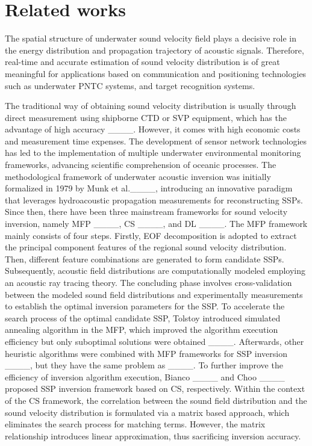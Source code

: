 \section{Related works}
The spatial structure of underwater sound velocity field plays a decisive role in the energy distribution and propagation trajectory of acoustic signals. Therefore, real-time and accurate estimation of sound velocity distribution is of great meaningful for applications based on communication and positioning technologies such as underwater PNTC systems, and target recognition systems.

The traditional way of obtaining sound velocity distribution is usually through direct measurement using shipborne CTD or SVP equipment, which has the advantage of high accuracy ____. However, it comes with high economic costs and measurement time expenses. The development of sensor network technologies has led to the implementation of multiple underwater environmental monitoring frameworks, advancing scientific comprehension of oceanic processes. The methodological framework of underwater acoustic inversion was initially formalized in 1979 by Munk et al.____, introducing an innovative paradigm that leverages hydroacoustic propagation measurements for reconstructing SSPs. Since then, there have been three mainstream frameworks for sound velocity inversion, namely MFP ____, CS ____, and DL ____. The MFP framework mainly consists of four steps. Firstly, EOF decomposition is adopted to extract the principal component features of the regional sound velocity distribution. Then, different feature combinations are generated to form candidate SSPs. Subsequently, acoustic field distributions are computationally modeled employing an acoustic ray tracing theory. The concluding phase involves cross-validation between the modeled sound field distributions and experimentally measurements to establish the optimal inversion parameters for the SSP. To accelerate the search process of the optimal candidate SSP, Tolstoy introduced simulated annealing algorithm in the MFP, which improved the algorithm execution efficiency but only suboptimal solutions were obtained ____. Afterwards, other heuristic algorithms were combined with MFP frameworks for SSP inversion ____, but they have the same problem as ____. To further improve the efficiency of inversion algorithm execution, Bianco ____ and Choo ____ proposed SSP inversion framework based on CS, respectively. Within the context of the CS framework, the correlation between the sound field distribution and the sound velocity distribution is formulated via a matrix based approach, which eliminates the search process for matching terms. However, the matrix relationship introduces linear approximation, thus sacrificing inversion accuracy.

